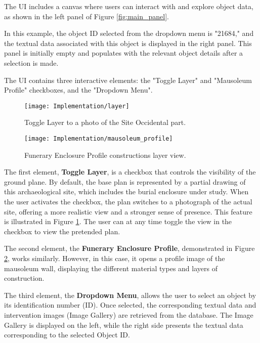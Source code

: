 The \gls{UI} includes a canvas where users can interact with and explore object data, as shown in the left panel of Figure \ref{fig:main_panel}. 

In this example, the object ID selected from the dropdown menu is "21684," and the textual data associated with this object is displayed in the right panel. 
This panel is initially empty and populates with the relevant object details after a selection is made. 

The \gls{UI} contains three interactive elements: the "Toggle Layer" and "Mausoleum Profile" checkboxes, and the "Dropdown Menu".

 \begin{figure}[h!]
    \centering
    \texttt{[image: Implementation/layer]}
    \caption{Toggle Layer to a photo of the Site Occidental part.}
    \label{fig:toggle_layer}    
\end{figure}


 \begin{figure}[h!]
    \centering
    \texttt{[image: Implementation/mausoleum\_profile]}
    \caption{Funerary Enclosure Profile constructions layer view.}
    \label{fig:mausoleum_profile}    
\end{figure}

The first element, \textbf{Toggle Layer}, is a checkbox that controls the visibility of the ground plane.
By default, the base plan is represented by a partial drawing of this archaeological site, which includes the burial enclosure under study. 
When the user activates the checkbox, the plan switches to a photograph of the actual site, offering a more realistic view and a stronger sense of presence. 
This feature is illustrated in Figure \ref{fig:toggle_layer}.
The user can at any time toggle the view in the checkbox to view the pretended plan.

The second element, the \textbf{Funerary Enclosure Profile}, demonstrated in Figure \ref{fig:mausoleum_profile}, works similarly. However, in this case, it opens a profile image of the mausoleum wall, displaying the different material types and layers of construction.

The third element, the \textbf{Dropdown Menu}, allows the user to select an object by its identification number (ID).
Once selected, the corresponding textual data and intervention images (Image Gallery) are retrieved from the database.
The Image Gallery is displayed on the left, while the right side presents the textual data corresponding to the selected Object ID.

